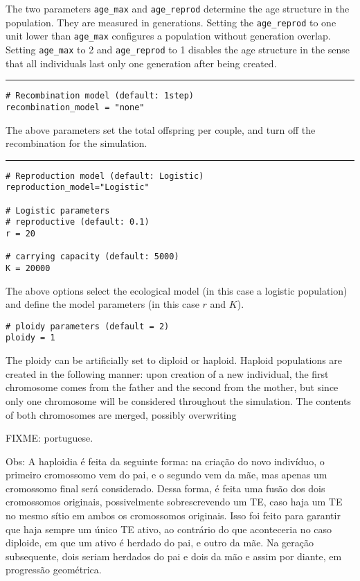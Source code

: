 \documentclass[10pt]{article}
\begin{document}
The two parameters \verb|age_max| and \verb|age_reprod| determine the
age structure in the population. They are measured in
generations. Setting the \verb|age_reprod| to one unit lower than
\verb|age_max| configures a population without generation
overlap. Setting \verb|age_max| to 2 and \verb|age_reprod| to 1
disables the age structure in the sense that all individuals
last only one generation after being created.

\centering\noindent\rule{0.5\textwidth}{0.4pt}

\begin{verbatim}
# Recombination model (default: 1step)
recombination_model = "none"
\end{verbatim}

The above parameters set the total offspring per couple, and turn off
the recombination for the simulation.

\centering\noindent\rule{0.5\textwidth}{0.4pt}

\begin{verbatim}
# Reproduction model (default: Logistic)
reproduction_model="Logistic"

# Logistic parameters
# reproductive (default: 0.1)
r = 20

# carrying capacity (default: 5000)
K = 20000
\end{verbatim}

The above options select the ecological model (in this case a logistic
population) and define the model parameters (in this case $r$ and
$K$).

\begin{verbatim}
# ploidy parameters (default = 2)
ploidy = 1
\end{verbatim}

The ploidy can be artificially set to diploid or haploid. Haploid
populations are created in the following manner: upon creation of a
new individual, the first chromosome comes from the father and the
second from the mother, but since only one chromosome will be considered
throughout the simulation. The contents of both chromosomes are
merged, possibly overwriting

FIXME: portuguese.

Obs: A haploidia é feita da seguinte forma: na criação do novo
indivíduo, o primeiro cromossomo vem do pai, e o segundo vem da mãe,
mas apenas um cromossomo final será considerado. Dessa forma, é feita
uma fusão dos dois cromossomos originais, possivelmente sobrescrevendo
um TE, caso haja um TE no mesmo sítio em ambos os cromossomos
originais. Isso foi feito para garantir que haja sempre um único TE
ativo, ao contrário do que aconteceria no caso diploide, em que um
ativo é herdado do pai, e outro da mãe. Na geração subsequente, dois
seriam herdados do pai e dois da mão e assim por diante, em progressão
geométrica.
\end{document}
